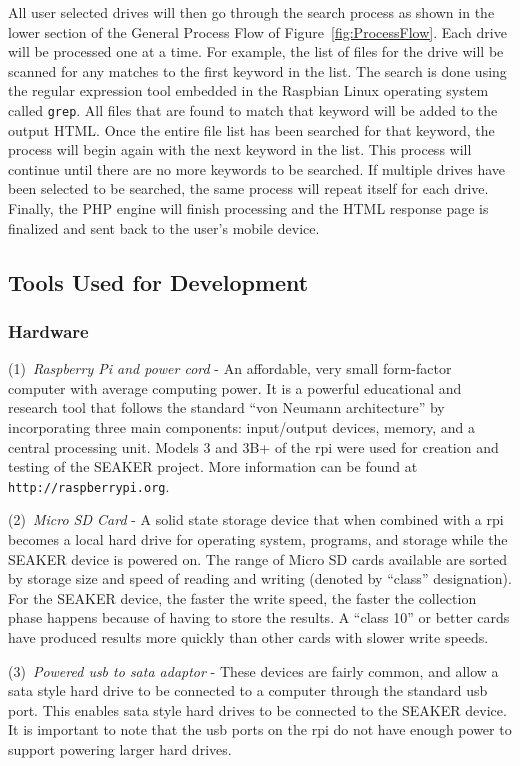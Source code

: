 \documentclass[12pt]{article}
\begin{document}
All user selected drives will then go through the search process as
shown in the lower section of the General Process Flow of
Figure~\ref{fig:ProcessFlow}. Each drive will be processed one at a
time. For example, the list of files for the drive will be scanned
for any matches to the first keyword in the list. The search is done
using the regular expression tool embedded in the Raspbian Linux
operating system called \verb|grep|. All files that are found to match
that keyword will be added to the output HTML. Once the entire file
list has been searched for that keyword, the process will begin again
with the next keyword in the list. This process will continue until
there are no more keywords to be searched. If multiple drives have
been selected to be searched, the same process will repeat itself
for each drive. Finally, the PHP engine will finish processing and
the HTML response page is finalized and sent back to the user's
mobile device.


\subsection{Tools Used for Development}

\subsubsection{Hardware}

(1)~{\em Raspberry Pi and power cord} - An affordable, very small
form-factor computer with average computing power. It is a powerful 
educational and research tool that follows the
standard ``von Neumann architecture'' by 
incorporating three main components: input/output devices, memory, and a 
central processing unit.  Models 3 and 3B+ of the \gls{rpi} were used
for creation and testing of the SEAKER project. More information can be
found at {\tt http://raspberrypi.org}.

(2)~{\em Micro SD Card} - A solid state storage device that when combined
with a \gls{rpi} becomes a local hard drive for operating system, programs,
and storage while the SEAKER device is powered on.  The range of Micro SD
cards available are sorted by storage size and speed of reading and writing
(denoted by ``class'' designation).  For
the SEAKER device, the faster the write speed, the faster the
collection phase happens because of having to store the results.
A ``class 10'' or better cards have produced results more quickly than
other cards with slower write speeds.

(3)~{\em Powered \gls{usb} to \gls{sata} adaptor} - These devices are fairly common, and
allow a \gls{sata} style hard drive to be connected to a computer through the
standard \gls{usb} port.  This enables \gls{sata} style hard drives to be connected
to the SEAKER device.  It is important to note that the \gls{usb} ports on the
\gls{rpi} do not have enough power to support powering larger hard
drives.
\end{document}
